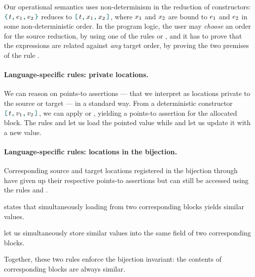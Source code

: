 Our operational semantics uses non-determinism in the reduction of constructors: $\datalangBlock{\datalangTag}{\datalangExpr_1}{\datalangExpr_2}$ reduces to $\datalangBlockDet{\datalangTag}{\datalangVar_1}{\datalangVar_2}$, where $\datalangVar_1$ and $\datalangVar_2$ are bound to $\datalangExpr_1$ and $\datalangExpr_2$ in some non-deterministic order.
In the program logic, the user may \emph{choose} an order for the source reduction, by using one of the rules  or , and it has to prove that the expressions are related against \emph{any} target order, by proving the two premises of the rule .

\paragraph{Language-specific rules: private locations.}
We can reason on points-to assertions --- that we interpret as locations private to the source or target --- in a standard way.
From a deterministic constructor $\datalangBlockDet{\datalangTag}{\datalangVal_1}{\datalangVal_2}$, we can apply  or , yielding a points-to assertion for the allocated block.
The rules  and  let us load the pointed value while  and  let us update it with a new value.

\paragraph{Language-specific rules: locations in the bijection.}
Corresponding source and target locations registered in the bijection through  have given up their respective points-to assertions but can still be accessed using the rules  and .

 states that simultaneously loading from two corresponding blocks yields similar values.

 let us simultaneously store similar values into the same field of two corresponding blocks.

Together, these two rules enforce the bijection invariant: the contents of corresponding blocks are always similar.

